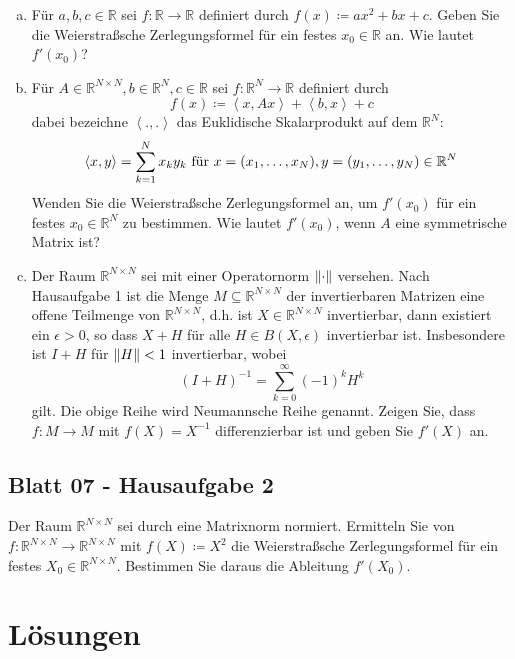 \documentclass{scrreprt}
\begin{document}
\begin{enumerate}[a)]
\item Für $a, b, c \in \mathbb{R}$ sei $f \colon \mathbb{R} \to \mathbb{R}$
  definiert durch $f(x) \coloneqq ax^2 + bx + c$.
  Geben Sie die Weierstraßsche Zerlegungsformel für ein festes
  $x_0 \in \mathbb{R}$ an.
  Wie lautet $f'(x_0)$?

\item Für $A \in \mathbb{R}^{N \times N}, b \in \mathbb{R}^N, c \in \mathbb{R}$ sei
  $f \colon \mathbb{R}^N \to \mathbb{R}$ definiert durch
  \[
    f(x) \coloneqq \left\langle x, Ax \right\rangle + \left\langle b, x \right\rangle + c
  \]
  dabei bezeichne $\left\langle ., . \right\rangle$ das Euklidische Skalarprodukt auf dem $\mathbb{R}^N \colon$
  \[
    \left\langle x, y \right\rangle = \sum_{k = 1}^N x_k y_k \text{ für } x = \qty(x_1, \ldots, x_N), y = \qty(y_1, \ldots, y_N) \in \mathbb{R}^N
  \]
  Wenden Sie die Weierstraßsche Zerlegungsformel an, um $f'(x_0)$ für ein festes
  $x_0 \in \mathbb{R}^N$ zu bestimmen.
  Wie lautet $f'(x_0)$, wenn $A$ eine symmetrische Matrix ist?
\item Der Raum $\mathbb{R}^{N \times N}$ sei mit einer Operatornorm
  $\norm{\cdot}$ versehen.
  Nach Hausaufgabe 1 ist die Menge $M \subseteq \mathbb{R}^{N \times N}$ der
  invertierbaren Matrizen eine offene Teilmenge von $\mathbb{R}^{N \times N}$,
  d.h. ist $X \in \mathbb{R}^{N \times N}$ invertierbar, dann existiert ein
  $\epsilon > 0$, so dass $X + H$ für alle $H \in B(X, \epsilon)$
  invertierbar ist.
  Insbesondere ist $I + H$ für $\norm{H} < 1$ invertierbar, wobei
  \[
    (I + H)^{-1} = \sum_{k = 0}^{\infty}(-1)^k H^k
  \]
  gilt.
  Die obige Reihe wird Neumannsche Reihe genannt.
  Zeigen Sie, dass $f \colon M \to M$ mit $f(X) = X^{-1}$ differenzierbar ist
  und geben Sie $f'(X)$ an.

\end{enumerate}

\section{Blatt 07 - Hausaufgabe 2}

Der Raum $\mathbb{R}^{N \times N}$ sei durch eine
Matrixnorm normiert.
Ermitteln Sie von $f \colon \mathbb{R}^{N \times N} \to \mathbb{R}^{N \times N}$
mit $f(X) \coloneqq X^2$ die Weierstraßsche Zerlegungsformel für ein festes
$X_0 \in \mathbb{R}^{N \times N}$.
Bestimmen Sie daraus die Ableitung $f'(X_0)$.

\chapter{Lösungen}
\end{document}
